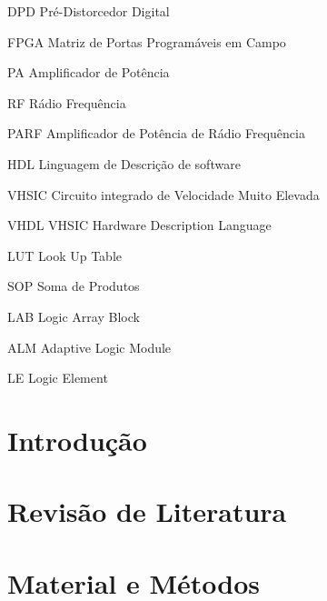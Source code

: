 \documentclass[
	12pt,				%
	openright,			%
	oneside,			%
	a4paper,			%
	brazil				%
	]{abntex2}
\begin{document}
\begin{siglas}  %
 \item[DPD]  Pré-Distorcedor Digital
 \item[FPGA] Matriz de Portas Programáveis em Campo 
 \item[PA] Amplificador de Potência
 \item[RF] Rádio Frequência 
 \item[PARF] Amplificador de Potência de Rádio Frequência 
 \item[HDL] Linguagem de Descrição de software
 \item[VHSIC]  Circuito integrado de Velocidade Muito Elevada 
 \item[VHDL]  VHSIC Hardware Description Language
 \item[LUT]  Look Up Table
 \item[SOP]  Soma de Produtos 
 \item[LAB]  Logic Array Block 
 \item[ALM]  Adaptive Logic Module
 \item[LE]   Logic Element 
\end{siglas}

\listoffigures*
\cleardoublepage
\tableofcontents*
\cleardoublepage



\textual

\setcounter{page}{1}

\chapter{Introdução}


\chapter{Revisão de Literatura}


\chapter{Material e Métodos}

\end{document}
